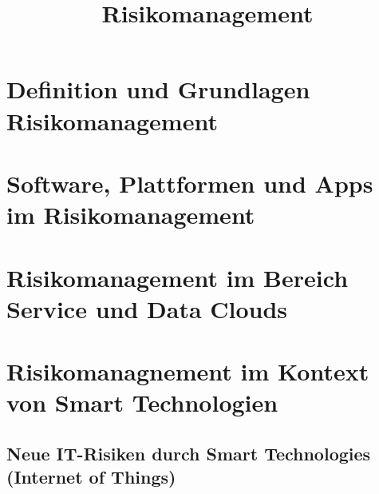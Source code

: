 \documentclass{report}
\begin{document}
\pagestyle{plain}

\title{Risikomanagement}


\maketitle

\tableofcontents
\newpage


\chapter{Definition und Grundlagen Risikomanagement}
\label{sect:grundlagen}


\chapter{Software, Plattformen und Apps im Risikomanagement}
\label{sect:software}



\chapter{Risikomanagement im Bereich Service und Data Clouds}
\label{sect:clouds}



\chapter{Risikomanagnement im Kontext von Smart Technologien}
\label{sect:relevance}

\section{Neue IT-Risiken durch Smart Technologies (Internet of Things)}
\end{document}
